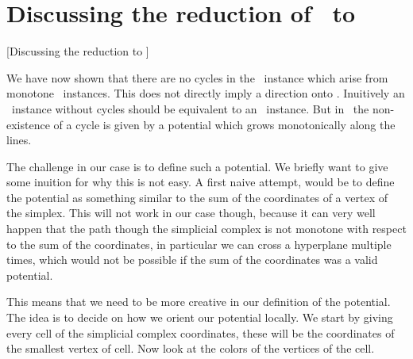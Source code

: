 \section{Discussing the reduction of \Tarskistar\ to \EndOfPotentialLine}[Discussing the reduction to \EOPL]

We have now shown that there are no cycles in the \EndOfLine\ instance which arise from monotone \Tarskistar\ instances. This does not directly imply a direction onto \EndOfPotentialLine. Inuitively an \EndOfLine\ instance without cycles should be equivalent to an \EndOfPotentialLine\ instance. But in \EndOfPotentialLine\ the non-existence of a cycle is given by a potential which grows monotonically along the lines.

The challenge in our case is to define such a potential. We briefly want to give some inuition for why this is not easy. A first naive attempt, would be to define the potential as something similar to the sum of the coordinates of a vertex of the simplex. This will not work in our case though, because it can very well happen that the path though the simplicial complex is not monotone with respect to the sum of the coordinates, in particular we can cross a hyperplane multiple times, which would not be possible if the sum of the coordinates was a valid potential.

This means that we need to be more creative in our definition of the potential. The idea is to decide on how we orient our potential locally. We start by giving every cell of the simplicial complex coordinates, these will be the coordinates of the smallest vertex of cell. Now look at the colors of the vertices of the cell.